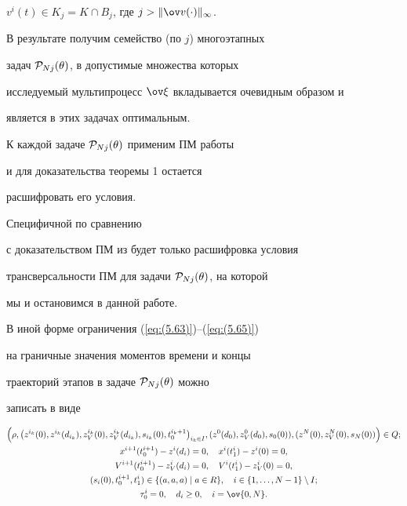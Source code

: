 $v^i(t)\in K_j =K\cap B_j$, где $j>\|\ov v(\cdot)\|_\infty$.


В результате получим семейство (по $j$) многоэтапных


задач ${\cal P}_{Nj}(\theta)$, в допустимые множества которых


исследуемый мультипроцесс $\ov \xi$ вкладывается очевидным образом и


является в этих задачах оптимальным.


К каждой задаче ${\cal P}_{Nj}(\theta)$ применим ПМ работы


\cite{Clarke.Vinter} и для доказательства теоремы 1 остается


расшифровать его условия.


Специфичной по сравнению


с доказательством ПМ из \cite{DS99} будет только расшифровка условия


трансверсальности ПМ для задачи ${\cal P}_{Nj}(\theta)$, на которой


мы и остановимся в данной работе.





В иной форме ограничения (\ref{eq:(5.63)})--(\ref{eq:(5.65)})


на граничные значения моментов времени и концы


траекторий этапов в задаче ${\cal P}_{Nj}(\theta)$ можно


записать в виде


\begin{gather*}


\Big(\rho,\big(z^{i_k}(0),z^{i_k}(d_{i_k}),z_V^{i_k}(0),


z_V^{i_k}(d_{i_k}), s_{i_k}(0),t_0^{i_k+1}\big)_{i_k\in I},


(z^0(d_0),z_V^0(d_0),s_0(0)),


(z^N(0),z_V^N(0),s_N(0))\Big)\in Q; \\


%


x^{i+1}(t_0^{i+1})-z^i(d_i)=0, \quad x^{i}(t_1^{i})-z^i(0)=0, \\


V^{i+1}(t_0^{i+1})-z_V^i(d_i)=0, \quad


V^{i}(t_1^{i})-z_V^i(0)=0,\\


%


(s_i(0),t_0^{i+1},t_1^i)\in


\{(a,a,a)\mid a\in R\}, \quad i\in \{1,\dotsc,N-1\}\setminus I; \\


%


\tau_0^i=0,\quad d_i\geq 0,\quad i=\ov{0,N}.


\end{gather*}


